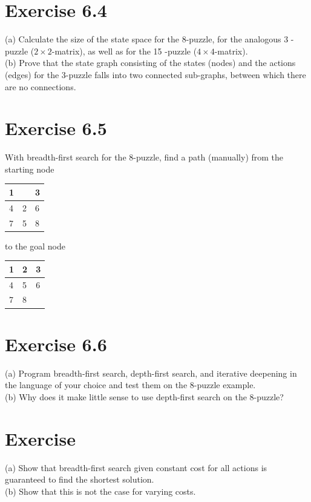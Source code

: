 \documentclass[10pt]{book}
\begin{document}
\section{Exercise 6.4}
(a) Calculate the size of the state space for the 8-puzzle, for the analogous 3 -puzzle ($2 \times 2$-matrix), as well as for the 15 -puzzle ($4 \times 4$-matrix).\\
(b) Prove that the state graph consisting of the states (nodes) and the actions (edges) for the 3-puzzle falls into two connected sub-graphs, between which there are no connections.

\section{Exercise 6.5}
With breadth-first search for the 8-puzzle, find a path (manually) from the starting node
\begin{center}
\begin{tabular}{|l|l|l|}
\hline
1 &  & 3 \\
\hline
4 & 2 & 6 \\
\hline
7 & 5 & 8 \\
\hline
\end{tabular}
\end{center}
to the goal node
\begin{center}
\begin{tabular}{|l|l|l|}
\hline
1 & 2 & 3 \\
\hline
4 & 5 & 6 \\
\hline
7 & 8 &  \\
\hline
\end{tabular}
\end{center}

\section{Exercise 6.6}
(a) Program breadth-first search, depth-first search, and iterative deepening in the language of your choice and test them on the 8-puzzle example.\\
(b) Why does it make little sense to use depth-first search on the 8-puzzle?

\section{Exercise}
(a) Show that breadth-first search given constant cost for all actions is guaranteed to find the shortest solution.\\
(b) Show that this is not the case for varying costs.
\end{document}
